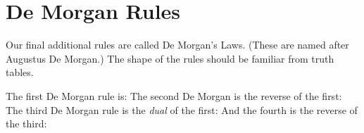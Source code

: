 

%
\section{De Morgan Rules}
Our final additional rules are called De Morgan's Laws. (These are named after Augustus De Morgan.) The shape of the rules should be familiar from truth tables.

The first De Morgan rule is:
The second De Morgan is the reverse of the first:
The third De Morgan rule is the \emph{dual} of the first:
And the fourth is the reverse of the third:
\bigskip



